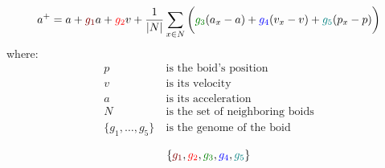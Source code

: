 \documentclass{article}
\newcommand*{\mathcolor}{}
\def\mathcolor#1#{\mathcoloraux{#1}}
\newcommand*{\mathcoloraux}[3]{%
  \protect\leavevmode
  \begingroup
    \color#1{#2}#3%
  \endgroup
}
\begin{document}
$$a^{+} = a + \mathcolor{maroon}{g_1}a + \mathcolor{red}{g_2}v + \frac {1} {\lvert N \rvert} \sum_{x \in N}\bigg(\mathcolor{green}{g_3}(a_x-a)+\mathcolor{blue}{g_4}(v_x-v)+\mathcolor{teal}{g_5}(p_x-p)\bigg)$$
where:\\
\begin{align*}
p&~ \text{is the boid's position}\\
v&~ \text{is its velocity}\\
a&~ \text{is its acceleration}\\
N&~ \text{is the set of neighboring boids}\\
\{g_1, \ldots, g_5\}&~ \text{is the genome of the boid}
\end{align*}

$$\{ \mathcolor{maroon}{g_1}, \mathcolor{red}{g_2}, \mathcolor{green}{g_3}, \mathcolor{blue}{g_4}, \mathcolor{teal}{g_5} \}$$ 
\end{document}
